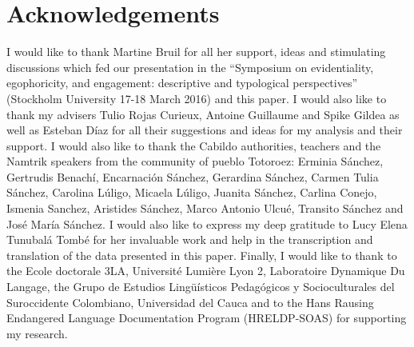 \documentclass[output=paper]{langsci/langscibook}
\begin{document}
\section*{Acknowledgements}
I would like to thank Martine Bruil for all her support, ideas and stimulating discussions which fed our presentation in the “Symposium on evidentiality, egophoricity, and engagement: descriptive and typological perspectives” (Stockholm University 17-18 March 2016) and this paper. I would also like to thank my advisers Tulio Rojas Curieux, Antoine Guillaume and Spike Gildea as well as Esteban Díaz for all their suggestions and ideas for my analysis and their support. I would also like to thank the Cabildo authorities, teachers and the Namtrik speakers from the community of pueblo Totoroez: Erminia Sánchez, Gertrudis Benachí, Encarnación Sánchez, Gerardina Sánchez, Carmen Tulia Sánchez, Carolina Lúligo, Micaela Lúligo, Juanita Sánchez, Carlina Conejo, Ismenia Sanchez, Aristides Sánchez, Marco Antonio Ulcué, Transito Sánchez and  José María Sánchez. I would also like to express my deep gratitude to Lucy Elena Tunubalá Tombé for her invaluable work and help in the transcription and translation of the data presented in this paper. Finally, I would like to thank to  the Ecole doctorale 3LA, Université Lumière Lyon 2, Laboratoire Dynamique Du Langage, the Grupo de Estudios Lingüísticos Pedagógicos y Socioculturales del Suroccidente Colombiano, Universidad del Cauca and to the Hans Rausing Endangered Language Documentation Program (HRELDP-SOAS) for supporting my research. 

\sloppy
\printbibliography[heading=subbibliography,notkeyword=this]
\end{document}

